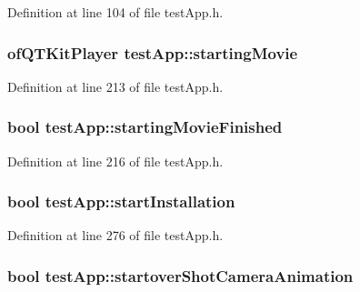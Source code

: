 Definition at line 104 of file test\-App.\-h.

\hypertarget{classtest_app_a9bfe7793fa0689a991ff64174745c38f}{
\subsubsection[{starting\-Movie}]{\setlength{\rightskip}{0pt plus 5cm}of\-Q\-T\-Kit\-Player test\-App\-::starting\-Movie}}\label{classtest_app_a9bfe7793fa0689a991ff64174745c38f}


Definition at line 213 of file test\-App.\-h.

\hypertarget{classtest_app_aea3cb9f5f0061a42a4953d6b6c949036}{
\subsubsection[{starting\-Movie\-Finished}]{\setlength{\rightskip}{0pt plus 5cm}bool test\-App\-::starting\-Movie\-Finished}}\label{classtest_app_aea3cb9f5f0061a42a4953d6b6c949036}


Definition at line 216 of file test\-App.\-h.

\hypertarget{classtest_app_a8a65a6d1a473417cec1c2ac2e6116aae}{
\subsubsection[{start\-Installation}]{\setlength{\rightskip}{0pt plus 5cm}bool test\-App\-::start\-Installation}}\label{classtest_app_a8a65a6d1a473417cec1c2ac2e6116aae}


Definition at line 276 of file test\-App.\-h.

\hypertarget{classtest_app_ad2fca6ce5e37462cd820afc48633324d}{
\subsubsection[{startover\-Shot\-Camera\-Animation}]{\setlength{\rightskip}{0pt plus 5cm}bool test\-App\-::startover\-Shot\-Camera\-Animation}}\label{classtest_app_ad2fca6ce5e37462cd820afc48633324d}


